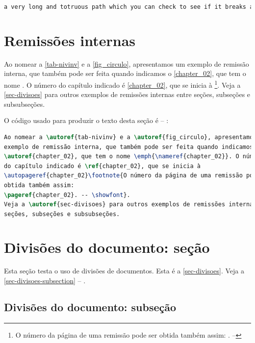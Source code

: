 \begin{lstlisting}[language=bash]
a very long and totruous path which you can check to see if it breaks and where at the end of the line
\end{lstlisting}



\section{Remissões internas}

Ao nomear a \autoref{tab-nivinv} e a \autoref{fig_circulo}, apresentamos um
exemplo de remissão interna, que também pode ser feita quando indicamos o
\autoref{chapter_02}, que tem o nome \emph{}. O número
do capítulo indicado é \ref{chapter_02}, que se inicia à
\footnote{O número da página de uma remissão pode ser
    obtida também assim:
    \pageref{chapter_02}. -- \showfont}.
Veja a \autoref{sec-divisoes} para outros exemplos de remissões internas entre
seções, subseções e subsubseções.

O código usado para produzir o texto desta seção é -- \showfont:

\begin{lstlisting}[language=TeX,caption={[TeX example]{TeX example -- \showfont}}]
Ao nomear a \autoref{tab-nivinv} e a \autoref{fig_circulo}, apresentamos um
exemplo de remissão interna, que também pode ser feita quando indicamos o
\autoref{chapter_02}, que tem o nome \emph{\nameref{chapter_02}}. O número
do capítulo indicado é \ref{chapter_02}, que se inicia à
\autopageref{chapter_02}\footnote{O número da página de uma remissão pode ser
obtida também assim:
\pageref{chapter_02}. -- \showfont}.
Veja a \autoref{sec-divisoes} para outros exemplos de remissões internas entre
seções, subseções e subsubseções.
\end{lstlisting}



\section{Divisões do documento: seção}\label{sec-divisoes}

Esta seção testa o uso de divisões de documentos. Esta é a
\autoref{sec-divisoes}. Veja a \autoref{sec-divisoes-subsection} -- \showfont.



\subsection{Divisões do documento: subseção}\label{sec-divisoes-subsection}

